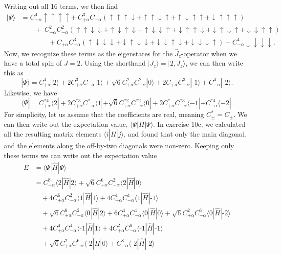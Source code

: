 \documentclass[a4paper, 11pt, notitlepage, english]{article}
\newcommand{\bra}[1]{\langle #1|}
\newcommand{\ket}[1]{|#1 \rangle}
\newcommand{\op}[1]{\hat{#1}}
\newcommand{\braopket}[3]{\langle #1 | {#2} | #3 \rangle}
\renewcommand{\d}{{\rm d}}
\renewcommand{\u}{\uparrow}
\renewcommand{\d}{\downarrow}
\newcommand{\dddd}{\d\d\d\d}
\newcommand{\uddd}{\u\d\d\d}
\newcommand{\dudd}{\d\u\d\d}
\newcommand{\ddud}{\d\d\u\d}
\newcommand{\dddu}{\d\d\d\u}
\newcommand{\uudd}{\u\u\d\d}
\newcommand{\udud}{\u\d\u\d}
\newcommand{\uddu}{\u\d\d\u}
\newcommand{\duud}{\d\u\u\d}
\newcommand{\dudu}{\d\u\d\u}
\newcommand{\dduu}{\d\d\u\u}
\newcommand{\uuud}{\u\u\u\d}
\newcommand{\uudu}{\u\u\d\u}
\newcommand{\uduu}{\u\d\u\u}
\newcommand{\duuu}{\d\u\u\u}
\newcommand{\uuuu}{\u\u\u\u}
\newcommand{\m}{\text{-}}
\begin{document}
\newpage

Writing out all 16 terms, we then find
\begin{align*}
\ket{\Psi} &= C_{+\alpha}^4 \uuuu + \ C_{+\alpha}^3 C_{-\alpha}(\uuud + \uudu + \uduu + \duuu) \\ &\qquad+ \ C_{+\alpha}^2 C_{-\alpha}^2(\uudd + \udud + \uddu + \duud + \dudu + \dduu) \\
&\qquad\qquad + C_{+\alpha} C_{-\alpha}^3 (\uddd + \dudd + \ddud + \dddu) + C_{-\alpha}^4\dddd.
\end{align*}
Now, we recognize these terms as the eigenstates for the $\op{J}_z$-operator when we have a total spin of $J=2$. Using the shorthand $\ket{J_z} = \ket{2,J_z}$, we can then write this as
$$\ket{\Psi} = C_{+\alpha}^4 \ket{2} + 2C_{+\alpha}^3 C_{-\alpha}\ket{1} + \sqrt{6}C_{+\alpha}^2 C_{-\alpha}^2 \ket{0} + 2C_{+\alpha} C_{-\alpha}^3 \ket{\m 1} + C_{-\alpha}^4\ket{\m 2}.$$
Likewise, we have
$$\bra{\Psi} = C_{+\alpha}^{*4} \bra{2} + 2C_{+\alpha}^{*3} C_{-\alpha}^*\bra{1} + \sqrt{6}C_{+\alpha}^{*2} C_{-\alpha}^{*2} \bra{0} + 2C_{+\alpha}^* C_{-\alpha}^{*3} \bra{-1} + C_{-\alpha}^{*4}\bra{-2}.$$
For simplicity, let us assume that the coefficients are real, meaning $C_\pm^* = C_\pm$. We can then write out the expectation value, $\braopket{\Psi}{H}{\Psi}$. In exercise 10e, we calculated all the resulting matrix elements $\braopket{i}{\op{H}}{j}$, and found that only the main diagonal, and the elements along the off-by-two diagonals were non-zero. Keeping only these terms we can write out the expectation value
\begin{align*}
E &= \braopket{\Psi}{\op{H}}{\Psi} \\
&= C_{+\alpha}^{8}                \braopket{2}{\op{H}}{ 2} 
+ \sqrt{6}C_{+\alpha}^{6}C_{-\alpha}^{2} \braopket{2}{\op{H}}{ 0} \\
%
&\quad+ 4C_{+\alpha}^{6}C_{-\alpha}^{2} \braopket{1}{\op{H}}{ 1} 
+ 4C_{+\alpha}^{4}C_{-\alpha}^{4} \braopket{1}{\op{H}}{\m 1} \\ 
%
&\quad+ \sqrt{6}C_{+\alpha}^{6}C_{-\alpha}^{2} \braopket{0}{\op{H}}{ 2} 
+ 6C_{+\alpha}^{4}C_{-\alpha}^{4} \braopket{0}{\op{H}}{ 0} 
+ \sqrt{6}C_{+\alpha}^{2}C_{-\alpha}^{6} \braopket{0}{\op{H}}{\m 2} \\
%
&\quad+ 4C_{+\alpha}^{4}C_{-\alpha}^{4} \braopket{\m 1}{\op{H}}{1} 
+ 4C_{+\alpha}^{2}C_{-\alpha}^{6} \braopket{\m 1}{\op{H}}{\m 1} \\ 
%
&\quad+ \sqrt{6}C_{+\alpha}^{2}C_{-\alpha}^{6} \braopket{\m 2}{\op{H}}{ 0} 
+ C_{-\alpha}^{8}                \braopket{\m 2}{\op{H}}{\m 2} \\
\end{align*}
\end{document}
